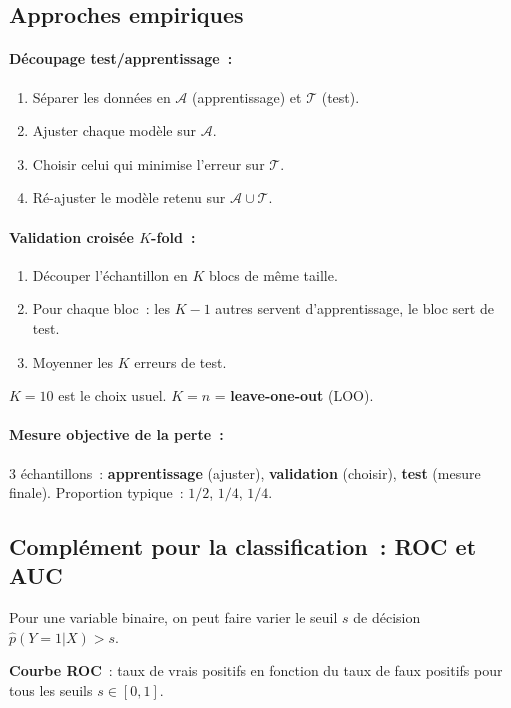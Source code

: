 \documentclass[a4paper,11pt]{article}
\theoremstyle{definition}
\theoremstyle{remark}
\begin{document}
\subsection{Approches empiriques}

\paragraph{D\'ecoupage test/apprentissage~:}
\begin{enumerate}
  \item S\'eparer les donn\'ees en $\mathcal{A}$ (apprentissage)
    et $\mathcal{T}$ (test).
  \item Ajuster chaque mod\`ele sur $\mathcal{A}$.
  \item Choisir celui qui minimise l'erreur sur $\mathcal{T}$.
  \item R\'e-ajuster le mod\`ele retenu sur
    $\mathcal{A} \cup \mathcal{T}$.
\end{enumerate}

\paragraph{Validation crois\'ee $K$-fold~:}
\begin{enumerate}
  \item D\'ecouper l'\'echantillon en $K$ blocs de m\^eme taille.
  \item Pour chaque bloc~: les $K-1$ autres servent
    d'apprentissage, le bloc sert de test.
  \item Moyenner les $K$ erreurs de test.
\end{enumerate}
$K=10$ est le choix usuel. $K=n$ = \textbf{leave-one-out} (LOO).

\paragraph{Mesure objective de la perte~:}
3 \'echantillons~: \textbf{apprentissage} (ajuster),
\textbf{validation} (choisir), \textbf{test} (mesure finale).
Proportion typique~: $1/2$, $1/4$, $1/4$.

\subsection{Compl\'ement pour la classification~: ROC et AUC}

Pour une variable binaire, on peut faire varier le seuil $s$ de
d\'ecision $\hat{p}(Y=1|X) > s$.

\textbf{Courbe ROC}~: taux de vrais positifs en fonction du taux
de faux positifs pour tous les seuils $s \in [0,1]$.
\end{document}
